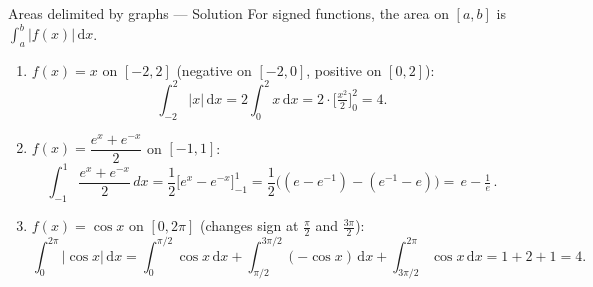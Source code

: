 \documentclass[9pt]{beamer}
\begin{document}
\begin{frame}{Areas delimited by graphs — Solution}
\small
For signed functions, the area on $[a,b]$ is $\displaystyle \int_a^b |f(x)|\,\mathrm{d}x$.
\begin{enumerate}[leftmargin=0.5cm,label=(\alph*),rightmargin=0.2cm]
  \item $f(x)=x$ on $[-2,2]$ (negative on $[-2,0]$, positive on $[0,2]$):
  \[
  \int_{-2}^2 |x|\,\mathrm{d}x=2\int_0^2 x\,\mathrm{d}x=2\cdot\Big[\tfrac{x^2}{2}\Big]_0^2=\boxed{4}.
  \]

  \item $f(x)=\dfrac{e^x+e^{-x}}{2}$ on $[-1,1]$:
    \[
    \int_{-1}^{1}\frac{e^x+e^{-x}}{2}\,dx
    =\frac12\Big[e^x - e^{-x}\Big]_{-1}^{1}
    =\frac12\Big((e - e^{-1})-(e^{-1}-e)\Big)
    =\boxed{\,e-\tfrac{1}{e}\,}.
    \]

  \item $f(x)=\cos x$ on $[0,2\pi]$ (changes sign at $\tfrac{\pi}{2}$ and $\tfrac{3\pi}{2}$):
  \[
  \int_0^{2\pi}\!|\cos x|\,\mathrm{d}x
  =\int_0^{\pi/2}\!\cos x\,\mathrm{d}x+\int_{\pi/2}^{3\pi/2}\!(-\cos x)\,\mathrm{d}x+\int_{3\pi/2}^{2\pi}\!\cos x\,\mathrm{d}x
  =1+2+1=\boxed{4}.
  \]
\end{enumerate}
\end{frame}


    







\end{document}
